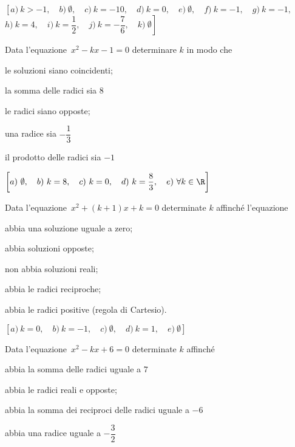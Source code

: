 \begin{flushright}
\(\left[a)~k >-1,\quad b)~\emptyset,\quad c)~k =-10,\quad 
        d)~k = 0,\quad e)~ \emptyset ,\quad f)~ k =-1 ,\quad 
        g)~ k =-1 ,\quad \right.\)
       \(\left. h)~ k = 4 ,\quad i)~ k = \dfrac{1}{2} ,\quad 
        j)~ k =-\dfrac{7}{6} ,\quad k)~\emptyset\right]\)
\end{flushright}

\begin{esercizio}[*]
 \label{ese:3.98}
Data l'equazione~\(x^{2}-kx -1 = 0\) determinare \(k\) in modo che
\begin{enumeratea}
\item le soluzioni siano coincidenti;~
\item la somma delle radici sia \(8\)
\item le radici siano opposte;~
\item una radice sia \(- \dfrac{1}{3}\)
\item il prodotto delle radici sia \(-1\)
\end{enumeratea}
\end{esercizio}

\begin{flushright}
\(\left[a)~\emptyset ,\quad b)~k = 8 ,\quad c)~ k = 0,\quad 
d)~k = \dfrac{8}{3} ,\quad e)~\forall k \in \R\right]\)
\end{flushright}

\begin{esercizio}[*]
 \label{ese:3.99}
Data l'equazione~\(x^{2} + (k + 1) x + k = 0\) determinate \(k\) affinché 
l'equazione
\begin{enumeratea}
\item abbia una soluzione uguale a zero;~
\item abbia soluzioni opposte;~
\item non abbia soluzioni reali;~
\item abbia le radici reciproche;~
\item abbia le radici positive (regola di Cartesio).
\end{enumeratea}
\end{esercizio}

\begin{flushright}
\(\left[a)~ k = 0 ,\quad b)~ k =-1 ,\quad c)~ \emptyset ,\quad 
d)~ k = 1 ,\quad e)~ \emptyset \right]\)
\end{flushright}

\begin{esercizio}[*]
 \label{ese:3.100}
Data l'equazione~\(x^{2}-kx + 6 = 0\) determinate \(k\) affinché
\begin{enumeratea}
\item abbia la somma delle radici uguale a \(7\)
\item abbia le radici reali e opposte;~
\item abbia la somma dei reciproci delle radici uguale a \(-6\)
\item abbia una radice uguale a \(- \dfrac{3}{2}\)
\end{enumeratea}
\end{esercizio}

